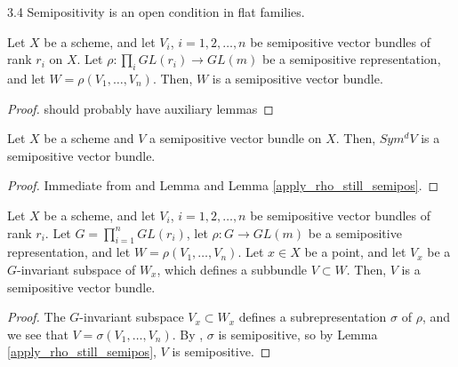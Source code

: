 \begin{lemma}
3.4 Semipositivity is an open condition in flat families.
\end{lemma}

\begin{lemma}\label{apply_rho_still_semipos}
Let $X$ be a scheme, and let $V_i$, $i=1,2,\ldots,n$ be semipositive vector bundles of rank $r_i$ on $X$. Let $\rho:\prod_i GL(r_i)\to GL(m)$ be a semipositive representation, and let $W=\rho(V_1,\ldots,V_n)$. Then, $W$ is a semipositive vector bundle.
\end{lemma}

\begin{proof}
should probably have auxiliary lemmas
\end{proof}

\begin{lemma}
Let $X$ be a scheme and $V$ a semipositive vector bundle on $X$. Then, $Sym^dV$ is a semipositive vector bundle.
\end{lemma}

\begin{proof}
Immediate from and Lemma  and Lemma \ref{apply_rho_still_semipos}.
\end{proof}

\begin{lemma}
Let $X$ be a scheme, and let $V_i$, $i=1,2,\ldots,n$ be semipositive vector bundles of rank $r_i$. Let $G=\prod_{i=1}^{n}GL(r_i)$, let $\rho:G\to GL(m)$ be a semipositive representation, and let $W=\rho(V_1,\ldots,V_n)$. Let $x\in X$ be a point, and let $V_x$ be a $G$-invariant subspace of $W_x$, which defines a subbundle $V\subset W$. Then, $V$ is a semipositive vector bundle.
\end{lemma}

\begin{proof}
The $G$-invariant subspace $V_x\subset W_x$ defines a subrepresentation $\sigma$ of $\rho$, and we see that $V=\sigma(V_1,\ldots,V_n)$. By , $\sigma$ is semipositive, so by Lemma \ref{apply_rho_still_semipos}, $V$ is semipositive.
\end{proof}







